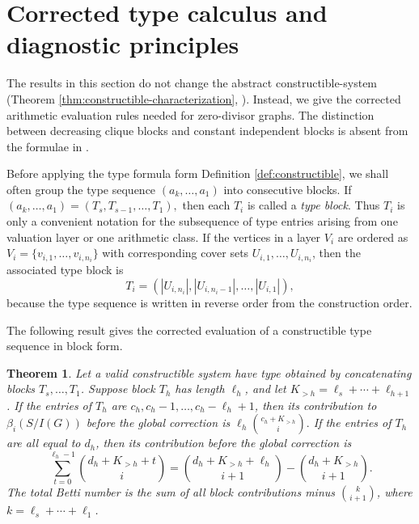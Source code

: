 \documentclass[12pt]{article}
\newtheorem{theorem}{Theorem}[section]
\theoremstyle{definition}
\begin{document}
\medskip

\section{Corrected type calculus and diagnostic principles}\label{sec:type-calculus}

The results in this section do not change the abstract constructible-system (Theorem \ref{thm:constructible-characterization}, \cite{DungVu2026}). Instead, we give the corrected arithmetic evaluation rules needed for zero-divisor graphs.  The distinction between decreasing clique blocks and constant independent blocks is absent from the formulae in \cite{DungVu2026}.

\medskip

Before applying the type formula form Definition \ref{def:constructible}, we shall often group the type sequence
$(a_k,\ldots,a_1)$ into consecutive blocks.  If $(a_k,\ldots,a_1)=(T_s,T_{s-1},\ldots,T_1),$ then each $T_i$ is called a \emph{type block}.  Thus $T_i$ is  only a convenient notation for the
subsequence of type entries arising from one valuation layer or one arithmetic
class.  If the vertices in a layer $V_i$ are ordered as
$V_i=\{v_{i,1},\ldots,v_{i,n_i}\}$ with corresponding cover sets
$U_{i,1},\ldots,U_{i,n_i}$, then the associated type block is
\[
T_i=(|U_{i,n_i}|,|U_{i,n_i-1}|,\ldots,|U_{i,1}|),
\]
because the type sequence is written in reverse order from the construction
order.

\medskip

\noindent The following result gives the corrected evaluation of a constructible type sequence in block form.
\begin{theorem}\label{prop:block-evaluation}
Let a valid constructible system have type obtained by concatenating blocks $T_s,\ldots,T_1$.  Suppose block $T_h$ has length $\ell_h$, and let $K_{>h}=\ell_s+\cdots+\ell_{h+1}$.  If the entries of $T_h$ are $c_h,c_h-1,\ldots,c_h-\ell_h+1$, then its contribution to $\beta_i(S/I(G))$ before the global correction is
$ \ell_h\binom{c_h+K_{>h}}{i}. $
If the entries of $T_h$ are all equal to $d_h$, then its contribution before the global correction is
$$
\sum_{t=0}^{\ell_h-1}\binom{d_h+K_{>h}+t}{i}
=\binom{d_h+K_{>h}+\ell_h}{i+1}-\binom{d_h+K_{>h}}{i+1}.
$$
The total Betti number is the sum of all block contributions minus $\binom{k}{i+1}$, where $k=\ell_s+\cdots+\ell_1$.
\end{theorem}
\end{document}
